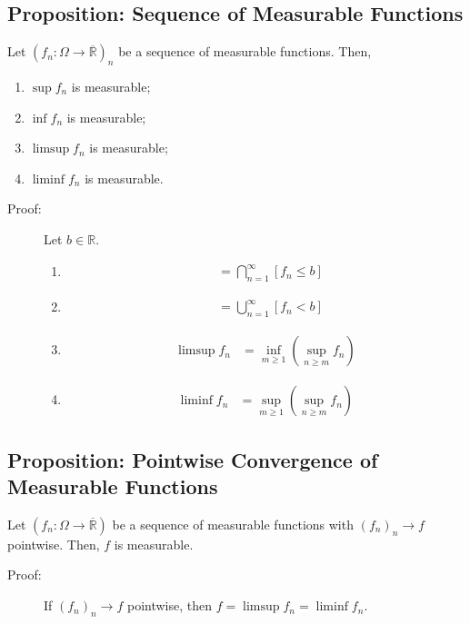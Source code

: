 \documentclass[9pt]{extarticle}
\newcommand{\R}{\mathbb{R}}
\begin{document}
  \subsection{Proposition: Sequence of Measurable Functions}%
  Let $\left(f_n: \Omega \rightarrow \overline{\R}\right)_{n}$ be a sequence of measurable functions. Then,
  \begin{enumerate}[(1)]
    \item $\sup f_n$ is measurable;
    \item $\inf f_n$ is measurable;
    \item $\limsup f_n$ is measurable;
    \item $\liminf f_n$ is measurable.
  \end{enumerate}
  \begin{description}
    \item[Proof:] Let $b\in \R$.
      \begin{enumerate}[(1)]
        \item 
          \begin{align*}
            [\sup f_n \leq b] &= \bigcap_{n=1}^{\infty}[f_n \leq b]
          \end{align*}
        \item 
          \begin{align*}
            [\inf f_n < b] &= \bigcup_{n=1}^{\infty}[f_n < b]
          \end{align*}
        \item 
          \begin{align*}
            \limsup f_n &= \inf_{m\geq 1}\left(\sup_{n\geq m}f_n\right)
          \end{align*}
        \item 
          \begin{align*}
            \liminf f_n &= \sup_{m\geq 1}\left(\sup_{n\geq m}f_n\right)
          \end{align*}
      \end{enumerate}
  \end{description}
  \subsection{Proposition: Pointwise Convergence of Measurable Functions}%
  Let $\left(f_{n}:\Omega \rightarrow \overline{\R}\right)$ be a sequence of measurable functions with $(f_n)_n \rightarrow f$ pointwise. Then, $f$ is measurable.
  \begin{description}
    \item[Proof:] If $(f_n)_n \rightarrow f$ pointwise, then $f = \limsup f_n = \liminf f_n$.
  \end{description}
\end{document}
